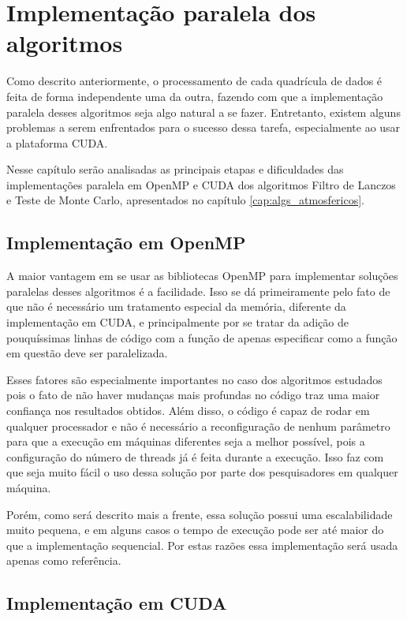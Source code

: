 \chapter{Implementação paralela dos algoritmos}

Como descrito anteriormente, o processamento de cada quadrícula de dados é feita de forma independente uma da outra, fazendo com que a implementação paralela desses algoritmos seja algo natural a se fazer. Entretanto, existem alguns problemas a serem enfrentados para o sucesso dessa tarefa, especialmente ao usar a plataforma CUDA.

Nesse capítulo serão analisadas as principais etapas e dificuldades das implementações paralela em OpenMP \cite{openmp_guide} e CUDA \cite{cuda_guide} dos algoritmos Filtro de Lanczos e Teste de Monte Carlo, apresentados no capítulo \ref{cap:algs_atmosfericos}.

\section{Implementação em OpenMP}

A maior vantagem em se usar as bibliotecas OpenMP \cite{openmp_guide} para implementar soluções paralelas desses algoritmos é a facilidade. Isso se dá primeiramente pelo fato de que não é necessário um tratamento especial da memória, diferente da implementação em CUDA, e principalmente por se tratar da adição de pouquíssimas linhas de código com a função de apenas especificar como a função em questão deve ser paralelizada.

Esses fatores são especialmente importantes no caso dos algoritmos estudados pois o fato de não haver mudanças mais profundas no código traz uma maior confiança nos resultados obtidos. Além disso, o código é capaz de rodar em qualquer processador e não é necessário a reconfiguração de nenhum parâmetro para que a execução em máquinas diferentes seja a melhor possível, pois a configuração do número de threads já é feita durante a execução. Isso faz com que seja muito fácil o uso dessa solução por parte dos pesquisadores em qualquer máquina.

Porém, como será descrito mais a frente, essa solução possui uma escalabilidade muito pequena, e em alguns casos o tempo de execução pode ser até maior do que a implementação sequencial. Por estas razões essa implementação será usada apenas como referência.

\section{Implementação em CUDA}

